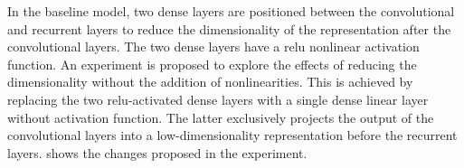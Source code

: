 
In the baseline model, two dense layers are positioned
between the convolutional and recurrent layers to reduce the
dimensionality of the representation after the convolutional
layers. The two dense layers have a \gls{relu} nonlinear
activation function. An experiment is proposed to explore
the effects of reducing the dimensionality without the
addition of nonlinearities. This is achieved by replacing
the two \gls{relu}-activated dense layers with a single
dense linear layer without activation function. The latter
exclusively projects the output of the convolutional layers
into a low-dimensionality representation before the
recurrent layers.  shows the changes
proposed in the experiment. 

